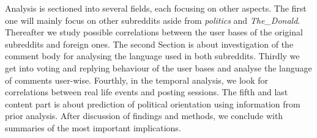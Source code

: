 \documentclass[runningheads,a4paper]{llncs}
\newcommand{\boards}[1]{\textit{politics} #1 \textit{The\_Donald}}
\begin{document}
	Analysis is sectioned into several fields, each focusing on other aspects.
	The first one will mainly focus on other subreddits aside from \boards{and}. Thereafter we study possible correlations between the user bases of the original subreddits and foreign ones.
	The second Section is about investigation of the comment body for analysing the language used in both subreddits.
	Thirdly we get into voting and replying behaviour of the user bases and analyse the language of comments user-wise.
	Fourthly, in the temporal analysis, we look for correlations between real life events and posting sessions.
	The fifth and last content part is about prediction of political orientation using information from prior analysis.
	After discussion of findings and methods, we conclude with summaries of the most important implications.
	
\end{document}

